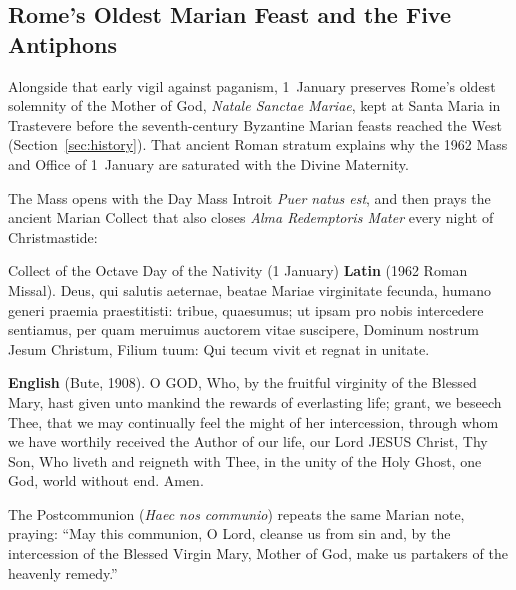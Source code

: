 \subsection{Rome's Oldest Marian Feast and the Five Antiphons}

Alongside that early vigil against paganism, 1~January preserves Rome's oldest
solemnity of the Mother of God, \textit{Natale Sanctae Mariae}, kept at Santa
Maria in Trastevere before the seventh-century Byzantine Marian feasts reached
the West (Section~\ref{sec:history}). That ancient Roman stratum explains why
the 1962 Mass and Office of 1~January are saturated with the Divine Maternity.

The Mass opens with the Day Mass Introit \textit{Puer natus est}, and then
prays the ancient Marian Collect that also closes \textit{Alma Redemptoris
Mater} every night of Christmastide:

\begin{massbox}{Collect of the Octave Day of the Nativity (1 January)}
\textbf{Latin} (1962 Roman Missal). Deus, qui salutis aeternae, beatae Mariae
virginitate fecunda, humano generi praemia praestitisti: tribue, quaesumus; ut
ipsam pro nobis intercedere sentiamus, per quam meruimus auctorem vitae
suscipere, Dominum nostrum Jesum Christum, Filium tuum: Qui tecum vivit et
regnat in unitate.

\textbf{English} (Bute, 1908). O GOD, Who, by the fruitful virginity of the
Blessed Mary, hast given unto mankind the rewards of everlasting life; grant, we
beseech Thee, that we may continually feel the might of her intercession,
through whom we have worthily received the Author of our life, our Lord JESUS
Christ, Thy Son, Who liveth and reigneth with Thee, in the unity of the Holy
Ghost, one God, world without end. Amen.
\end{massbox}

The Postcommunion (\textit{Haec nos communio}) repeats the same Marian note,
praying: ``May this communion, O Lord, cleanse us from sin and, by the
intercession of the Blessed Virgin Mary, Mother of God, make us partakers of the
heavenly remedy.''

